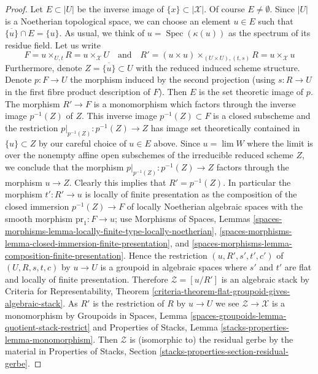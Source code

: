\documentclass{stacks-project}
\theoremstyle{plain}
\theoremstyle{definition}
\theoremstyle{remark}
\numberwithin{equation}{subsection}
\def\lim{\mathop{\mathrm{lim}}\nolimits}
\def\Spec{\mathop{\mathrm{Spec}}}
\begin{document}
\begin{proof}
\medskip\noindent
Let $E \subset |U|$ be the inverse image of $\{x\} \subset |\mathcal{X}|$.
Of course $E \not = \emptyset$.
Since $|U|$ is a Noetherian topological space, we can choose an element
$u \in E$ such that $\overline{\{u\}} \cap E = \{u\}$.
As usual, we think of $u = \Spec(\kappa(u))$ as the spectrum of
its residue field. Let us write
$$
F = u \times_{U, t} R = u \times_\mathcal{X} U
\quad\text{and}\quad
R' = (u \times u) \times_{(U \times U), (t, s)} R = u \times_\mathcal{X} u
$$
Furthermore, denote $Z = \overline{\{u\}} \subset U$ with the reduced
induced scheme structure. Denote $p : F \to U$ the morphism induced
by the second projection (using $s : R \to U$ in the first fibre product
description of $F$). Then $E$ is the set theoretic image of $p$.
The morphism $R' \to F$ is a monomorphism which factors through the
inverse image $p^{-1}(Z)$ of $Z$. This inverse image
$p^{-1}(Z) \subset F$ is a closed subscheme and
the restriction $p|_{p^{-1}(Z)} : p^{-1}(Z) \to Z$ has image
set theoretically contained in $\{u\} \subset Z$ by our careful
choice of $u \in E$ above. Since $u = \lim W$ where the limit
is over the nonempty affine open subschemes of the irreducible reduced scheme
$Z$, we conclude that the morphism $p|_{p^{-1}(Z)} : p^{-1}(Z) \to Z$
factors through the morphism $u \to Z$. Clearly this implies that
$R' = p^{-1}(Z)$. In particular the morphism $t' : R' \to u$ is
locally of finite presentation as the composition of the closed
immersion $p^{-1}(Z) \to F$ of locally Noetherian algebraic spaces
with the smooth morphism $\text{pr}_1 : F \to u$; use
Morphisms of Spaces, Lemmas
\ref{spaces-morphisms-lemma-locally-finite-type-locally-noetherian},
\ref{spaces-morphisms-lemma-closed-immersion-finite-presentation}, and
\ref{spaces-morphisms-lemma-composition-finite-presentation}.
Hence the restriction $(u, R', s', t', c')$ of $(U, R, s, t, c)$
by $u \to U$ is a groupoid in algebraic spaces where $s'$ and $t'$
are flat and locally of finite presentation. Therefore
$\mathcal{Z} = [u/R']$ is an algebraic stack by
Criteria for Representability, Theorem
\ref{criteria-theorem-flat-groupoid-gives-algebraic-stack}.
As $R'$ is the restriction of $R$ by $u \to U$ we see
$\mathcal{Z} \to \mathcal{X}$ is a monomorphism by
Groupoids in Spaces, Lemma
\ref{spaces-groupoids-lemma-quotient-stack-restrict}
and
Properties of Stacks, Lemma \ref{stacks-properties-lemma-monomorphism}.
Then $\mathcal{Z}$ is (isomorphic to) the residual gerbe by
the material in Properties of Stacks, Section
\ref{stacks-properties-section-residual-gerbe}.
\end{proof}
\end{document}
